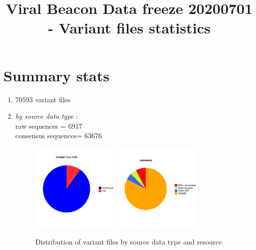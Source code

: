 \documentclass[a4paper, 10pt]{article}        %
\title{Viral Beacon Data freeze 20200701 - Variant files statistics}
\begin{document}
\date{}
\maketitle


\section{Summary stats}

\begin{enumerate}

\item  70593 variant files %




\item[] \textsl{by source data type} : \\
raw sequences = 6917 \\
consensus sequences=  63676\\


   \begin{figure}[!htb]
     \centering
     \includegraphics[width=0.4\textwidth]{all_type_pie.pdf}
       \includegraphics[width=0.4\textwidth]{all_reso_pie.pdf}
       \caption{Distribution of variant files by source data type and resource}
     \label{fig:illu}
 \end{figure}



\end{enumerate}
\end{document}
